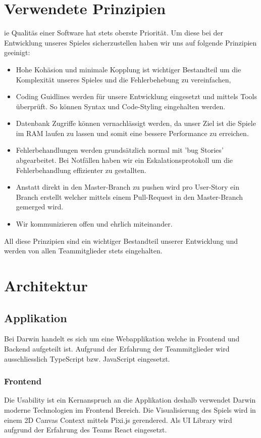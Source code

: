 \documentclass[a4paper, 11pt]{scrartcl}
\let\oldsection\section
\renewcommand\section{\clearpage\oldsection}
\begin{document}
\section{Verwendete Prinzipien}
ie Qualitäs einer Software hat stets oberste Priorität. Um diese bei der Entwicklung unseres Spieles
sicherzustellen haben wir uns auf folgende Prinzipien geeinigt:
\begin{itemize}
\item Hohe Kohäsion und minimale Kopplung ist wichtiger Bestandteil um die Komplexität unseres
 Spieles und die Fehlerbehebung zu vereinfachen,
\item Coding Guidlines werden für unsere Entwicklung eingesetzt und mittels Tools überprüft. So können Syntax und Code-Styling eingehalten werden.
\item Datenbank Zugriffe können vernachlässigt werden, da unser Ziel ist die Spiele im RAM laufen zu lassen und somit eine bessere Performance zu erreichen.
\item Fehlerbehandlungen werden grundsätzlich normal mit 'bug Stories' abgearbeitet. Bei Notfällen haben wir ein Eskalationsprotokoll um die Fehlerbehandlung effizienter zu gestallten.
\item Anstatt direkt in den Master-Branch zu pushen wird pro User-Story ein Branch erstellt welcher mittels einem Pull-Request in den Master-Branch gemerged wird.
\item Wir kommunizieren offen und ehrlich miteinander. 
\end{itemize}
All diese Prinzipien sind ein wichtiger Bestandteil unserer Entwicklung und werden von allen Teammitglieder stets eingehalten.

\section{Architektur}
\subsection{Applikation}
Bei Darwin handelt es sich um eine Webapplikation welche in Frontend und Backend aufgeteilt ist.
Aufgrund der Erfahrung der Teammitglieder wird ausschliesslich TypeScript bzw. JavaScript eingesetzt.

\subsubsection{Frontend}
Die Usability ist ein Kernanspruch an die Applikation deshalb verwendet Darwin moderne Technologien im Frontend Bereich.
Die Visualisierung des Spiels wird in einem 2D Canvas Context mittels Pixi.js gerendered.
Als UI Library wird aufgrund der Erfahrung des Teams React eingesetzt.
\end{document}
